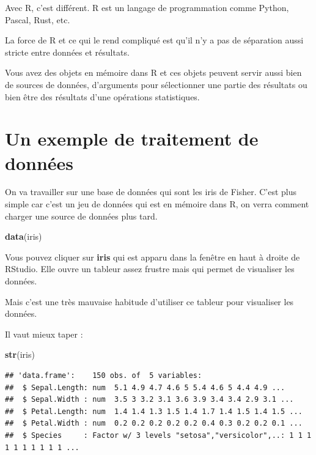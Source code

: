 \documentclass[
]{book}
\newenvironment{Shaded}{\begin{snugshade}}{\end{snugshade}}
\newcommand{\FunctionTok}[1]{\textcolor[rgb]{0.13,0.29,0.53}{\textbf{#1}}}
\newcommand{\NormalTok}[1]{#1}
\begin{document}
Avec R, c'est différent. R est un langage de programmation comme Python, Pascal,
Rust, etc.

La force de R et ce qui le rend compliqué est qu'il n'y a pas de séparation aussi
stricte entre données et résultats.

Vous avez des objets en mémoire dans R et ces objets peuvent servir aussi bien
de sources de données, d'arguments pour sélectionner une partie des résultats ou
bien être des résultats d'une opérations statistiques.

\section{Un exemple de traitement de données}\label{un-exemple-de-traitement-de-donnuxe9es}

On va travailler sur une base de données qui sont les iris de Fisher. C'est
plus simple car c'est un jeu de données qui est en mémoire dans R, on verra
comment charger une source de données plus tard.

\begin{Shaded}
\begin{Highlighting}[]
\FunctionTok{data}\NormalTok{(iris)}
\end{Highlighting}
\end{Shaded}

Vous pouvez cliquer sur \textbf{iris} qui est apparu dans la fenêtre en haut
à droite de RStudio. Elle ouvre un tableur assez frustre mais qui permet
de visualiser les données.

Mais c'est une très mauvaise habitude d'utiliser ce tableur pour visualiser
les données.

Il vaut mieux taper :

\begin{Shaded}
\begin{Highlighting}[]
\FunctionTok{str}\NormalTok{(iris)}
\end{Highlighting}
\end{Shaded}

\begin{verbatim}
## 'data.frame':    150 obs. of  5 variables:
##  $ Sepal.Length: num  5.1 4.9 4.7 4.6 5 5.4 4.6 5 4.4 4.9 ...
##  $ Sepal.Width : num  3.5 3 3.2 3.1 3.6 3.9 3.4 3.4 2.9 3.1 ...
##  $ Petal.Length: num  1.4 1.4 1.3 1.5 1.4 1.7 1.4 1.5 1.4 1.5 ...
##  $ Petal.Width : num  0.2 0.2 0.2 0.2 0.2 0.4 0.3 0.2 0.2 0.1 ...
##  $ Species     : Factor w/ 3 levels "setosa","versicolor",..: 1 1 1 1 1 1 1 1 1 1 ...
\end{verbatim}
\end{document}
